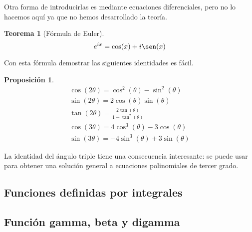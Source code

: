 \documentclass{article}
\newtheorem{theorem}{Teorema}
\newtheorem{prop}{Proposición}
\begin{document}
Otra forma de introducirlas es mediante ecuaciones diferenciales, pero no lo hacemos aquí ya que no hemos desarrollado la teoría.\\ 

\begin{theorem}[Fórmula de Euler]
	\begin{equation*}
		e^{ix} = \cos(x) + i\sen(x)
	\end{equation*}
\end{theorem}

Con esta fórmula demostrar las siguientes identidades es fácil.

\begin{prop}
	\begin{eqnarray*}
		\cos(2\theta) = \cos^2(\theta) - \sin^2(\theta) \\ 
		\sin(2\theta) = 2\cos(\theta)\sin(\theta) \\ 
		\tan(2\theta) = \frac{2\tan(\theta)}{1 - \tan^2(\theta)} \\ 
		\cos(3\theta) = 4\cos^3(\theta) - 3\cos(\theta) \\ 
		\sin(3\theta) = -4\sin^3(\theta) + 3\sin(\theta)
	\end{eqnarray*}
\end{prop}

La identidad del ángulo triple tiene una consecuencia interesante: se puede usar para obtener una solución general a ecuaciones polinomiales de tercer grado.

\subsection{Funciones definidas por integrales}

\subsection{Función gamma, beta y digamma}
\end{document}
